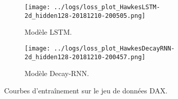\documentclass[../main.tex]{subfiles}
\begin{document}
\begin{frame}
\begin{figure}
	\begin{subfigure}{0.6\linewidth}
		\texttt{[image: ../logs/loss\_plot\_HawkesLSTM-2d\_hidden128-20181210-200505.png]}
		\caption{Modèle LSTM.}
	\end{subfigure}
	\begin{subfigure}{0.6\linewidth}
		\texttt{[image: ../logs/loss\_plot\_HawkesDecayRNN-2d\_hidden128-20181210-200457.png]}
		\caption{Modèle Decay-RNN.}
	\end{subfigure}
	\caption{Courbes d'entraînement sur le jeu de données DAX.}
\end{figure}
\end{frame}
\end{document}
